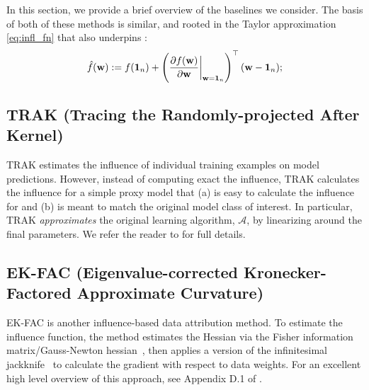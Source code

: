In this section, we provide a brief overview of the baselines we consider.
The basis of both of these methods is similar, and rooted in the Taylor
approximation \eqref{eq:infl_fn} that also underpins \method{}:
\begin{equation*}
  \hat{f}(\mathbf{w}) := f(\mathbf{1}_n) +
  \left(\frac{\partial f(\mathbf{w})}{\partial
  \mathbf{w}}\bigg|_{\mathbf{w}=\mathbf{1}_n}\right)^\top  (\mathbf{w} -
  \mathbf{1}_n);
\end{equation*}

\subsection{TRAK (Tracing the Randomly-projected After Kernel)}
TRAK \citep{park2023trak} estimates the influence of individual training
examples on model predictions. However, instead of computing exact the
influence, TRAK calculates the influence for a simple proxy model that (a) is
easy to calculate the influence for and (b) is meant to match the original model
class of interest. In particular, TRAK \textit{approximates} the original
learning algorithm, $\mathcal{A}$, by linearizing around the final parameters.
We refer the reader to \citet{park2023trak} for full details.

\subsection{EK-FAC (Eigenvalue-corrected Kronecker-Factored Approximate
Curvature)} EK-FAC \citep{bae2022if,grosse2023studying} is another
influence-based data attribution method. To estimate the influence function, the
method estimates the Hessian via the Fisher information matrix/Gauss-Newton
hessian~\citep{martens2015optimizing,george2018fast}, then applies a version of
the infinitesimal jackknife~\citep{giordano2019swiss} to calculate the gradient
with respect to data weights. For an excellent high level overview of this
approach, see Appendix D.1 of \citet{bae2024training}.

